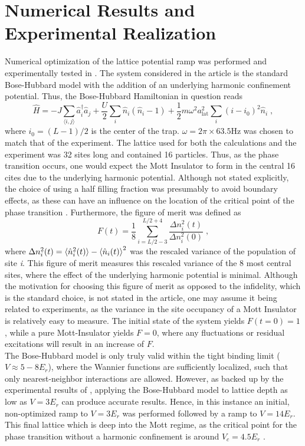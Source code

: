 \section{Numerical Results and Experimental Realization}
Numerical optimization of the lattice potential ramp was performed and experimentally tested in \cite{FrankBloch}. The system considered in the article is the standard Bose-Hubbard model with the addition of an underlying harmonic confinement potential. Thus, the Bose-Hubbard Hamiltonian in question reads
\begin{equation}
\hat{H} = - J \sum_{\langle i,j \rangle} \hat{a}_{i}^{\dag} \hat{a}_{j} + \frac{U}{2} \sum_{i} \hat{n}_i \left( \hat{n}_i -1 \right) + \frac{1}{2} m \omega^2 a_{\mathrm{lat}}^2 \sum_{i} \left( i - i_0 \right) ^2 \hat{n}_i \; ,  \label{eq:BHtrap}
\end{equation}
where $i_0 = (L -1)/2$ is the center of the trap. $\omega = 2 \pi \times 63.5 \mathrm{Hz}$ was chosen to match that of the experiment. The lattice used for both the calculations and the experiment was 32 sites long and contained 16 particles. Thus, as the phase transition occurs, one would expect the Mott Insulator to form in the central 16 cites due to the underlying harmonic potential. Although not stated explicitly, the choice of using a half filling fraction was presumably to avoid boundary effects, as these can have an influence on the location of the critical point of the phase transition \cite{Kuhner2000}. Furthermore, the figure of merit was defined as
\begin{equation}
	F(t) = \frac{1}{8} \sum_{i = L/2 -3}^{L/2 +4} \frac{\Delta n_{i}^2 (t)}{\Delta n_{i}^2 (0)} \; , \label{eq:FMerit}
\end{equation}
where $\Delta n_{i}^2 (t) = \braket{\hat{n}_{i}^2 (t)} - \braket{\hat{n}_{i} (t)}^2$ was the rescaled variance of the population of site \textit{i}. This figure of merit measures this rescaled variance of the 8 most central sites, where the effect of the underlying harmonic potential is minimal. Although the motivation for choosing this figure of merit as opposed to the infidelity, which is the standard choice, is not stated in the article, one may assume it being related to experiments, as the variance in the site occupancy of a Mott Insulator is relatively easy to measure. The initial state of the system yields $F(t=0) = 1$, while a pure Mott-Insulator yields $F = 0$, where any fluctuations or residual excitations will result in an increase of $F$.\\
The Bose-Hubbard model is only truly valid within the tight binding limit ($V \approx 5-8 E_r$), where the Wannier functions are sufficiently localized, such that only nearest-neighbor interactions are allowed. However, as backed up by the experimental results of \cite{FrankBloch}, applying the Bose-Hubbard model to lattice depth as low as $V = 3 E_r$ can produce accurate results. Hence, in this instance an initial, non-optimized ramp to $V = 3 E_r$ was performed followed by a ramp to $V = 14 E_r$. This final lattice which is deep into the Mott regime, as the critical point for the phase transition without a harmonic confinement is around $V_c = 4.5 E_r$ \cite{Kuhner2000}.
